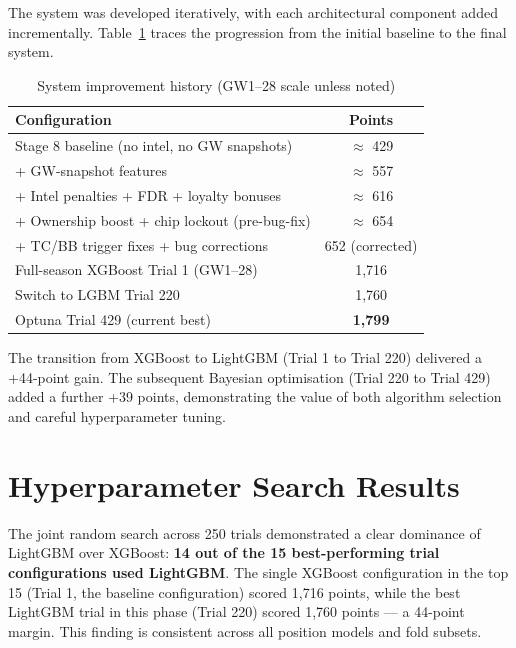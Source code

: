 The system was developed iteratively, with each architectural component added incrementally. Table~\ref{tab:improvement_en} traces the progression from the initial baseline to the final system.

\begin{table}[h]
\centering
\caption{System improvement history (GW1--28 scale unless noted)}
\label{tab:improvement_en}
\begin{tabular}{lc}
\toprule
\textbf{Configuration} & \textbf{Points} \\
\midrule
Stage 8 baseline (no intel, no GW snapshots)    & $\approx$ 429 \\
+ GW-snapshot features                           & $\approx$ 557 \\
+ Intel penalties + FDR + loyalty bonuses        & $\approx$ 616 \\
+ Ownership boost + chip lockout (pre-bug-fix)   & $\approx$ 654 \\
+ TC/BB trigger fixes + bug corrections          & 652 (corrected) \\
Full-season XGBoost Trial 1 (GW1--28)            & 1,716 \\
Switch to LGBM Trial 220                         & 1,760 \\
Optuna Trial 429 (current best)                  & \textbf{1,799} \\
\bottomrule
\end{tabular}
\end{table}

The transition from XGBoost to LightGBM (Trial 1 to Trial 220) delivered a +44-point gain. The subsequent Bayesian optimisation (Trial 220 to Trial 429) added a further +39 points, demonstrating the value of both algorithm selection and careful hyperparameter tuning.

\section{Hyperparameter Search Results}

The joint random search across 250 trials demonstrated a clear dominance of LightGBM over XGBoost: \textbf{14 out of the 15 best-performing trial configurations used LightGBM}. The single XGBoost configuration in the top 15 (Trial 1, the baseline configuration) scored 1,716 points, while the best LightGBM trial in this phase (Trial 220) scored 1,760 points — a 44-point margin. This finding is consistent across all position models and fold subsets.

